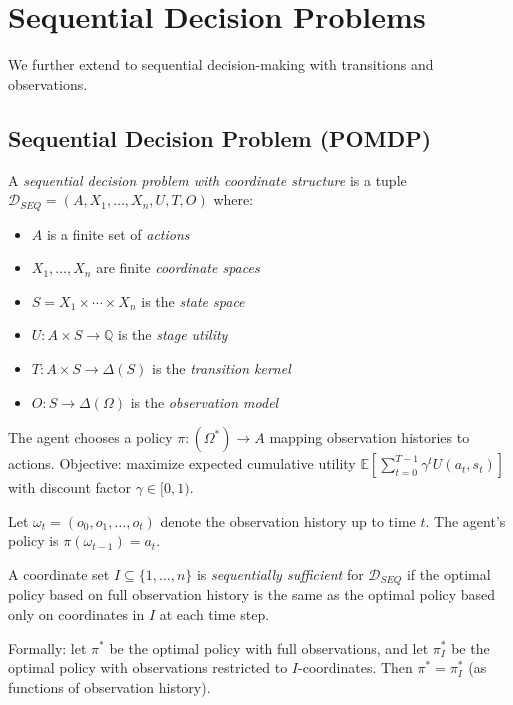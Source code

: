 \section{Sequential Decision Problems}\label{sec:sequential}

We further extend to sequential decision-making with transitions and observations.

\subsection{Sequential Decision Problem (POMDP)}

\begin{definition}\label{def:sequential-decision-problem}
A \emph{sequential decision problem with coordinate structure} is a tuple $\mathcal{D}_{SEQ} = (A, X_1, \ldots, X_n, U, T, O)$ where:
\begin{itemize}
\item $A$ is a finite set of \emph{actions}
\item $X_1, \ldots, X_n$ are finite \emph{coordinate spaces}
\item $S = X_1 \times \cdots \times X_n$ is the \emph{state space}
\item $U : A \times S \to \mathbb{Q}$ is the \emph{stage utility}
\item $T : A \times S \to \Delta(S)$ is the \emph{transition kernel}
\item $O : S \to \Delta(\Omega)$ is the \emph{observation model}
\end{itemize}
The agent chooses a policy $\pi : (\Omega^*) \to A$ mapping observation histories to actions. Objective: maximize expected cumulative utility $\mathbb{E}\left[\sum_{t=0}^{T-1} \gamma^t U(a_t, s_t)\right]$ with discount factor $\gamma \in [0,1)$.
\end{definition}

\begin{notation}
Let $\omega_t = (o_0, o_1, \ldots, o_t)$ denote the observation history up to time $t$. The agent's policy is $\pi(\omega_{t-1}) = a_t$.
\end{notation}

\begin{definition}\label{def:sequential-sufficient}
A coordinate set $I \subseteq \{1, \ldots, n\}$ is \emph{sequentially sufficient} for $\mathcal{D}_{SEQ}$ if the optimal policy based on full observation history is the same as the optimal policy based only on coordinates in $I$ at each time step.

Formally: let $\pi^*$ be the optimal policy with full observations, and let $\pi_I^*$ be the optimal policy with observations restricted to $I$-coordinates. Then $\pi^* = \pi_I^*$ (as functions of observation history).
\end{definition}

